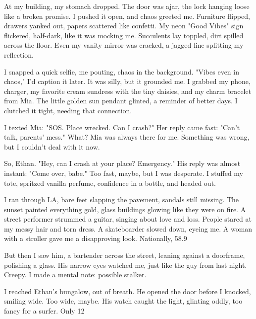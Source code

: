 \documentclass{article}
\begin{document}
At my building, my stomach dropped. The door was ajar, the lock hanging loose like a broken promise. I pushed it open, and chaos greeted me. Furniture flipped, drawers yanked out, papers scattered like confetti. My neon "Good Vibes" sign flickered, half-dark, like it was mocking me. Succulents lay toppled, dirt spilled across the floor. Even my vanity mirror was cracked, a jagged line splitting my reflection.

I snapped a quick selfie, me pouting, chaos in the background. "Vibes even in chaos," I'd caption it later. It was silly, but it grounded me. I grabbed my phone, charger, my favorite cream sundress with the tiny daisies, and my charm bracelet from Mia. The little golden sun pendant glinted, a reminder of better days. I clutched it tight, needing that connection.

I texted Mia: "SOS. Place wrecked. Can I crash?" Her reply came fast: "Can't talk, parents' mess." What? Mia was always there for me. Something was wrong, but I couldn't deal with it now.

So, Ethan. "Hey, can I crash at your place? Emergency." His reply was almost instant: "Come over, babe." Too fast, maybe, but I was desperate. I stuffed my tote, spritzed vanilla perfume, confidence in a bottle, and headed out.

I ran through LA, bare feet slapping the pavement, sandals still missing. The sunset painted everything gold, glass buildings glowing like they were on fire. A street performer strummed a guitar, singing about love and loss. People stared at my messy hair and torn dress. A skateboarder slowed down, eyeing me. A woman with a stroller gave me a disapproving look. Nationally, 58.9%

But then I saw him, a bartender across the street, leaning against a doorframe, polishing a glass. His narrow eyes watched me, just like the guy from last night. Creepy. I made a mental note: possible stalker.

I reached Ethan's bungalow, out of breath. He opened the door before I knocked, smiling wide. Too wide, maybe. His watch caught the light, glinting oddly, too fancy for a surfer. Only 12%
\end{document}
